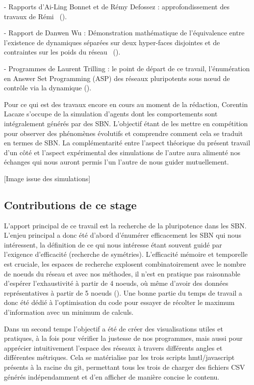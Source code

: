 \documentclass[12pt, a4paper]{article}
\begin{document}
- Rapports d'Ai-Ling Bonnet et de Rémy Defossez : approfondissement des travaux de Rémi~\cite{bonnet2023,defossez2021} ().

- Rapport de Danwen Wu : Démonstration mathématique de l'équivalence entre l'existence de dynamiques séparées sur deux hyper-faces disjointes et de contraintes sur les poids du réseau~\cite{wu2024} ().

- Programmes de Laurent Trilling : le point de départ de ce travail, l'énumération en Answer Set Programming (ASP) des réseaux pluripotents sous nœud de contrôle via la dynamique ().

Pour ce qui est des travaux encore en cours au moment de la rédaction, Corentin Lacaze s'occupe de la simulation d'agents dont les comportements sont intégralement générés par des SBN. L'objectif étant de les mettre en compétition pour observer des phénomènes évolutifs et comprendre comment cela se traduit en termes de SBN. La complémentarité entre l'aspect théorique du présent travail d'un côté et l'aspect expérimental des simulations de l'autre aura alimenté nos échanges qui nous auront permis l'un l'autre de nous guider mutuellement.

[Image issue des simulations]


\subsection{Contributions de ce stage}

L'apport principal de ce travail est la recherche de la pluripotence dans les SBN. L'enjeu principal a donc été d'abord d'énumérer efficacement les SBN qui nous intéressent, la définition de ce qui nous intéresse étant souvent guidé par l'exigence d'efficacité (recherche de symétries). L'efficacité mémoire et temporelle est cruciale, les espaces de recherche explosent combinatoirement avec le nombre de noeuds du réseau et avec nos méthodes, il n'est en pratique pas raisonnable d'espérer l'exhaustivité à partir de 4 noeuds, où même d'avoir des données représentatives à partir de 5 noeuds (). Une bonne partie du temps de travail a donc été dédié à l'optimisation du code pour essayer de récolter le maximum d'information avec un minimum de calculs.  

Dans un second temps l'objectif a été de créer des visualisations utiles et pratiques, à la fois pour vérifier la justesse de nos programmes, mais aussi pour apprécier intuitivement l'espace des réseaux à travers différents angles et différentes métriques. Cela se matérialise par les trois scripts hmtl/javascript présents à la racine du git, permettant tous les trois de charger des fichiers CSV générés indépendamment et d'en afficher de manière concise le contenu. 
\end{document}
